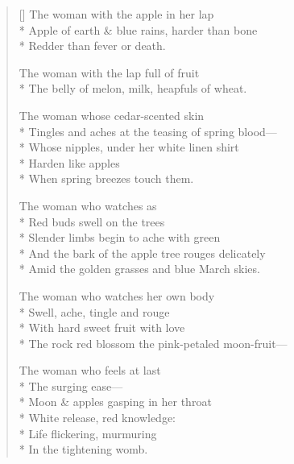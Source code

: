 \begin{verse}[\versewidth]
The woman with the apple in her lap\\*
Apple of earth \& blue rains, harder than bone\\*
Redder than fever or death.

The woman with the lap full of fruit\\*
The belly of melon, milk, heapfuls of wheat.

The woman whose cedar-scented skin\\*
Tingles and aches at the teasing of spring blood---\\*
Whose nipples, under her white linen shirt\\*
Harden like apples\\*
When spring breezes touch them.

The woman who watches as\\*
Red buds swell on the trees\\*
Slender limbs begin to ache with green\\*
And the bark of the apple tree rouges delicately\\*
Amid the golden grasses and blue March skies.

The woman who watches her own body\\*
Swell, ache, tingle and rouge\\*
With hard sweet fruit with love\\*
The rock red blossom the pink-petaled moon-fruit---

The woman who feels at last\\*
The surging ease---\\*
Moon \& apples gasping in her throat\\*
White release, red knowledge:\\*
Life flickering, murmuring\\*
In the tightening womb.
\end{verse}
